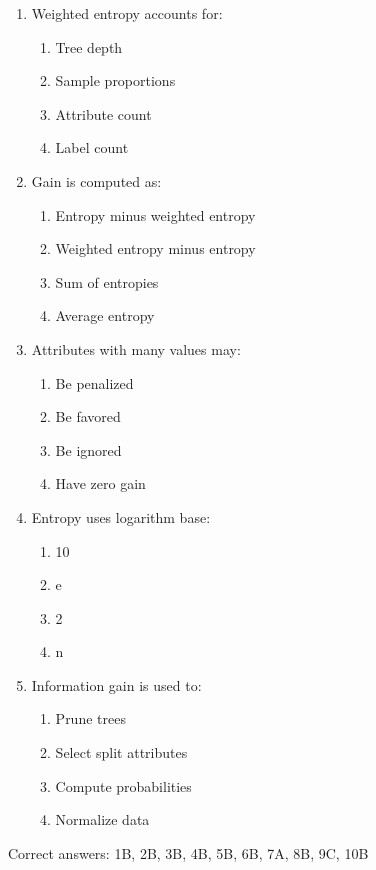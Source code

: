 \documentclass[3pt]{article}
\begin{document}
\begin{enumerate}
		\item Weighted entropy accounts for:
		\begin{enumerate}
			\item Tree depth
			\item Sample proportions
			\item Attribute count
			\item Label count
		\end{enumerate}
		
		\item Gain is computed as:
		\begin{enumerate}
			\item Entropy minus weighted entropy
			\item Weighted entropy minus entropy
			\item Sum of entropies
			\item Average entropy
		\end{enumerate}
		
		\item Attributes with many values may:
		\begin{enumerate}
			\item Be penalized
			\item Be favored
			\item Be ignored
			\item Have zero gain
		\end{enumerate}
		
		\item Entropy uses logarithm base:
		\begin{enumerate}
			\item 10
			\item e
			\item 2
			\item n
		\end{enumerate}
		
		\item Information gain is used to:
		\begin{enumerate}
			\item Prune trees
			\item Select split attributes
			\item Compute probabilities
			\item Normalize data
		\end{enumerate}
	\end{enumerate}
	
	Correct answers: 1B, 2B, 3B, 4B, 5B, 6B, 7A, 8B, 9C, 10B
	
\end{document}
